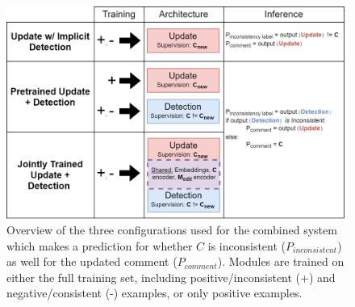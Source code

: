 \documentclass[letterpaper]{article} %
\newcommand{\Comment}{$C$}
\begin{document}
\begin{figure}[t!]
\centering
\includegraphics[scale=0.23]{images/combined_configurations.png}
\vspace{-5pt}
\caption{Overview of the three configurations used for the combined system which makes a prediction for whether \Comment{} is inconsistent ($P_{inconsistent}$) as well for the updated comment ($P_{comment}$). Modules are trained on either the full training set, including positive/inconsistent (+) and negative/consistent (-) examples, or only positive examples.}
\label{fig:combined_configs}
\end{figure}
\end{document}

